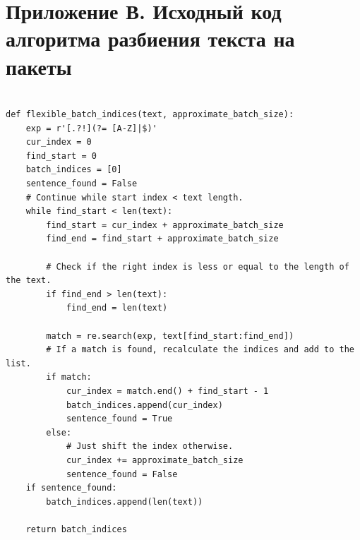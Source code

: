 \newpage
\section*{Приложение В. Исходный код  алгоритма разбиения текста на  пакеты}
\label{sec:code}

\begin{ListingEnv}[h]
\begin{lstlisting}

def flexible_batch_indices(text, approximate_batch_size):
    exp = r'[.?!](?= [A-Z]|$)'
    cur_index = 0
    find_start = 0
    batch_indices = [0]
    sentence_found = False
    # Continue while start index < text length.
    while find_start < len(text):
        find_start = cur_index + approximate_batch_size
        find_end = find_start + approximate_batch_size

        # Check if the right index is less or equal to the length of the text.
        if find_end > len(text):
            find_end = len(text)
     
        match = re.search(exp, text[find_start:find_end])
        # If a match is found, recalculate the indices and add to the list.
        if match:
            cur_index = match.end() + find_start - 1
            batch_indices.append(cur_index)
            sentence_found = True
        else:
            # Just shift the index otherwise.
            cur_index += approximate_batch_size
            sentence_found = False
    if sentence_found:
        batch_indices.append(len(text))
        
    return batch_indices
\end{lstlisting}
\end{ListingEnv}




%
%
%
%


